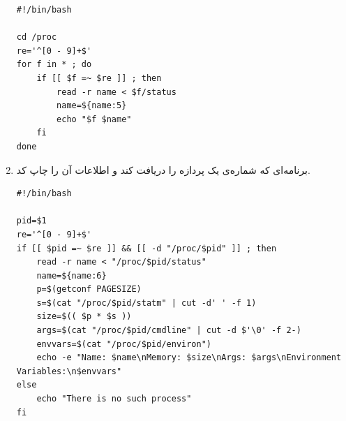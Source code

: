 \begin{enumerate}
		\begin{Verbatim}[tabsize=4]
#!/bin/bash

cd /proc
re='^[0 - 9]+$'
for f in * ; do
	if [[ $f =~ $re ]] ; then
		read -r name < $f/status
		name=${name:5}
		echo "$f $name"
	fi
done
		\end{Verbatim}
	
	\item 
	برنامه‌ای که شماره‌ی یک پردازه را دریافت کند و اطلاعات آن را چاپ کد.
	
	\begin{Verbatim}[tabsize=4]
#!/bin/bash

pid=$1
re='^[0 - 9]+$'
if [[ $pid =~ $re ]] && [[ -d "/proc/$pid" ]] ; then
	read -r name < "/proc/$pid/status"
	name=${name:6}
	p=$(getconf PAGESIZE)
	s=$(cat "/proc/$pid/statm" | cut -d' ' -f 1)
	size=$(( $p * $s ))
	args=$(cat "/proc/$pid/cmdline" | cut -d $'\0' -f 2-)
	envvars=$(cat "/proc/$pid/environ")
	echo -e "Name: $name\nMemory: $size\nArgs: $args\nEnvironment Variables:\n$envvars"
else
	echo "There is no such process"
fi
	\end{Verbatim}
	
\end{enumerate}


